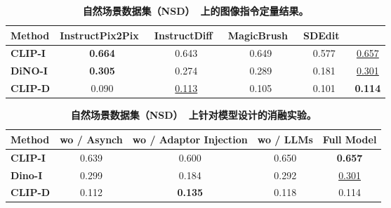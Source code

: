 \begin{table}[t]
\setlength{\tabcolsep}{11pt}
\renewcommand{\arraystretch}{1.1}
\centering
\caption{\textbf{自然场景数据集（NSD）~\cite{allen2022massive}上的图像指令定量结果。}}
\label{table:edit}
\begin{tabular}{lccccc}
\toprule
Method & InstructPix2Pix~\cite{brooks2023instructpix2pix} & InstructDiff~\cite{geng2023instructdiffusion} & MagicBrush~\cite{zhang2024magicbrush} & SDEdit~\cite{meng2021sdedit} & \textbf{\model{}} \\
\midrule
\textbf{CLIP-I} & \textbf{0.664} & 0.643 & 0.649 & 0.577 & \cellcolor{mygrey} \underline{0.657} \\
\textbf{DiNO-I} & \textbf{0.305} & 0.274 & 0.289 & 0.181 & \cellcolor{mygrey} \underline{0.301} \\
\textbf{CLIP-D} & 0.090 & \underline{0.113} & 0.105 & 0.101 & \cellcolor{mygrey} \textbf{0.114} \\
\bottomrule
\end{tabular}
\end{table}

\begin{table}[t!]
\setlength{\tabcolsep}{22pt}
\renewcommand{\arraystretch}{1.1}
\centering
\caption{\textbf{自然场景数据集（NSD）~\cite{allen2022massive}上针对模型设计的消融实验。}}
\label{table:ablation}
\begin{tabular}{lcccc}
\toprule
Method & wo / Asynch & wo / Adaptor Injection & wo / LLMs & \textbf{Full Model} \\
\midrule
\textbf{CLIP-I} & 0.639 & 0.600 & 0.650 & \cellcolor{mygrey} \textbf{0.657} \\
\textbf{Dino-I} & 0.299 & 0.184 & 0.292 & \cellcolor{mygrey} \underline{0.301} \\
\textbf{CLIP-D} & 0.112 & \textbf{0.135} & 0.118 & \cellcolor{mygrey} 0.114 \\
\bottomrule
\end{tabular}
\end{table}

